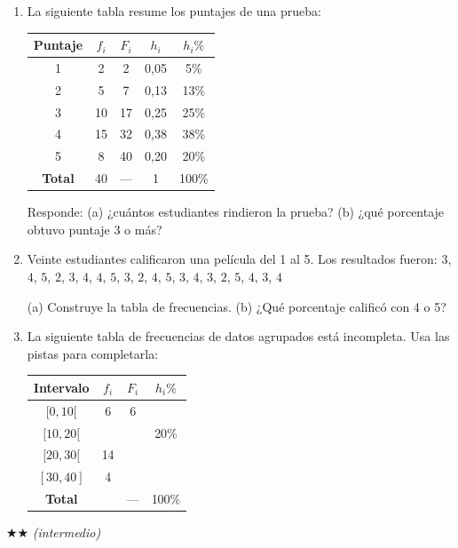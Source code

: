 \documentclass[11pt, letterpaper]{article}
\begin{document}
\begin{enumerate}[label=\textbf{\arabic*.}, leftmargin=*]
  \item La siguiente tabla resume los puntajes de una prueba:
  \begin{center}
  \renewcommand{\arraystretch}{1.3}
  \begin{tabular}{c c c c c}
  \toprule
  Puntaje & $f_i$ & $F_i$ & $h_i$ & $h_i\%$\\
  \midrule
  1 & 2 & 2 & 0{,}05 & 5\%\\
  2 & 5 & 7 & 0{,}13 & 13\%\\
  3 & 10 & 17 & 0{,}25 & 25\%\\
  4 & 15 & 32 & 0{,}38 & 38\%\\
  5 & 8 & 40 & 0{,}20 & 20\%\\
  \midrule
  \textbf{Total} & 40 & --- & 1 & 100\%\\
  \bottomrule
  \end{tabular}
  \end{center}
  Responde: (a) ¿cuántos estudiantes rindieron la prueba? (b) ¿qué porcentaje obtuvo puntaje 3 o más?

  \item Veinte estudiantes calificaron una película del 1 al 5. Los resultados fueron:
  $3$, $4$, $5$, $2$, $3$, $4$, $4$, $5$, $3$, $2$, $4$, $5$, $3$, $4$, $3$, $2$, $5$, $4$, $3$, $4$

  (a) Construye la tabla de frecuencias. (b) ¿Qué porcentaje calificó con 4 o 5?

  \item La siguiente tabla de frecuencias de datos agrupados está incompleta. Usa las pistas para completarla:
  \begin{center}
  \renewcommand{\arraystretch}{1.3}
  \begin{tabular}{c c c c}
  \toprule
  Intervalo & $f_i$ & $F_i$ & $h_i\%$\\
  \midrule
  $[0,10[$   & 6  & 6  & \\
  $[10,20[$  &    &    & 20\%\\
  $[20,30[$  & 14 &    & \\
  $[30,40]$  & 4  &    & \\
  \midrule
  \textbf{Total} &  & --- & 100\%\\
  \bottomrule
  \end{tabular}
  \end{center}
\end{enumerate}

$\bigstar\bigstar$ \textit{(intermedio)}
\end{document}
